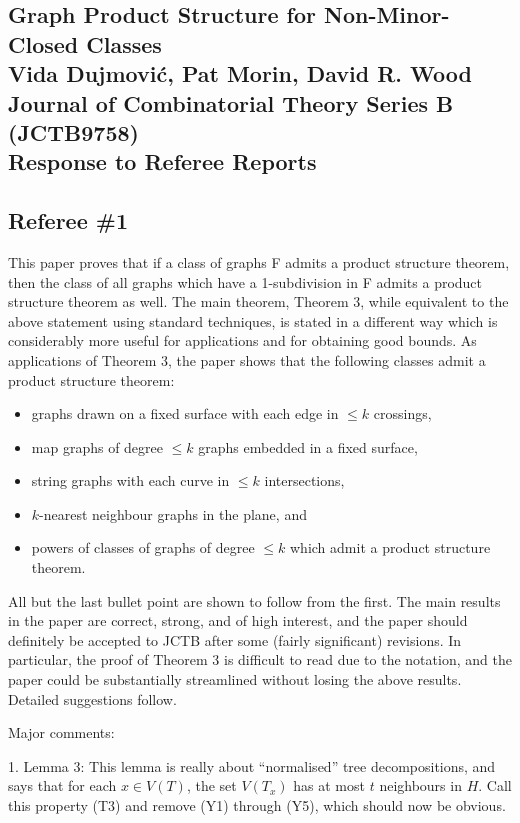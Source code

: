 \documentclass[12pt]{article}
\begin{document}
\subsection*{Graph Product Structure for Non-Minor-Closed Classes\\
Vida Dujmovi\'c, Pat Morin, David R. Wood\\
Journal of Combinatorial Theory Series B (JCTB9758)\\
Response to Referee Reports}
		
\subsection*{Referee \#1}

This paper proves that if a class of graphs F admits a product structure
theorem, then the class of all graphs which have a 1-subdivision in F admits
a product structure theorem as well. The main theorem, Theorem 3, while
equivalent to the above statement using standard techniques, is stated in
a different way which is considerably more useful for applications and for
obtaining good bounds. As applications of Theorem 3, the paper shows that
the following classes admit a product structure theorem:

\begin{itemize}
\item graphs drawn on a fixed surface with each edge in $\leq k$ crossings,
\item map graphs of degree $\leq k$ graphs embedded in a fixed surface,
\item string graphs with each curve in $\leq k$ intersections,
\item $k$-nearest neighbour graphs in the plane, and
\item powers of classes of graphs of degree $\leq k$ which admit a product structure theorem.
\end{itemize}

All but the last bullet point are shown to follow from the first.
The main results in the paper are correct, strong, and of high interest,
and the paper should definitely be accepted to JCTB after some
(fairly significant) revisions. In particular, the proof of Theorem 3 is
difficult to read due to the notation, and the paper could be substantially
streamlined without losing the above results. Detailed suggestions follow.

Major comments:

1. Lemma 3: This lemma is really about ``normalised'' tree decompositions, and says that for each $x \in V(T)$, the set $V(T_x)$ has at most $t$ neighbours in $H$. Call this property (T3) and remove (Y1)  through (Y5), which should now be obvious.
\end{document}

